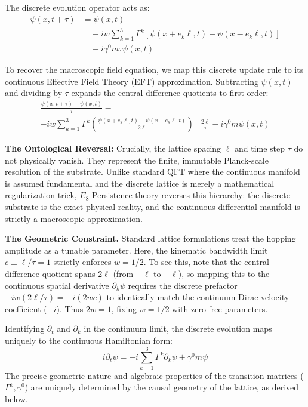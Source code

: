 The discrete evolution operator acts as:
\begin{equation}
\begin{aligned}
    \psi(x,t+\tau) &= \psi(x,t) \\
    &\quad - iw \sum_{k=1}^3 \Gamma^k \left[\psi(x+e_k\ell,t) - \psi(x-e_k\ell,t)\right] \\
    &\quad - i\gamma^0 m\tau\psi(x,t)
\end{aligned}
\label{eq:unitary_flux}
\end{equation}

To recover the macroscopic field equation, we map this discrete update rule to its continuous Effective Field Theory (EFT) approximation. Subtracting $\psi(x,t)$ and dividing by $\tau$ expands the central difference quotients to first order:
\begin{equation}
\begin{aligned}
    \frac{\psi(x,t+\tau) - \psi(x,t)}{\tau} = \\
    -iw \sum_{k=1}^3 \Gamma^k \left( \frac{\psi(x+e_k\ell,t) - \psi(x-e_k\ell,t)}{2\ell} \right) &\frac{2\ell}{\tau} - i\gamma^0 m\psi(x,t)
\end{aligned}
\label{eq:diff_form}
\end{equation}

\textbf{The Ontological Reversal:} Crucially, the lattice spacing $\ell$ and time step $\tau$ do not physically vanish. They represent the finite, immutable Planck-scale resolution of the substrate. Unlike standard QFT where the continuous manifold is assumed fundamental and the discrete lattice is merely a mathematical regularization trick, $E_8$-Persistence theory reverses this hierarchy: the discrete substrate is the exact physical reality, and the continuous differential manifold is strictly a macroscopic approximation.

\textbf{The Geometric Constraint.} Standard lattice formulations treat the hopping amplitude as a tunable parameter. Here, the kinematic bandwidth limit $c \equiv \ell/\tau = 1$ strictly enforces $w = 1/2$. To see this, note that the central difference quotient spans $2\ell$ (from $-\ell$ to $+\ell$), so mapping this to the continuous spatial derivative $\partial_k\psi$ requires the discrete prefactor $-iw(2\ell/\tau) = -i(2wc)$ to identically match the continuum Dirac velocity coefficient ($-i$). Thus $2w = 1$, fixing $w = 1/2$ with zero free parameters.

Identifying $\partial_t$ and $\partial_k$ in the continuum limit, the discrete evolution maps uniquely to the continuous Hamiltonian form:
\begin{equation}
    i \partial_t \psi = -i \sum_{k=1}^{3} \Gamma^k \partial_k \psi + \gamma^0 m \psi
\end{equation}
The precise geometric nature and algebraic properties of the transition matrices ($\Gamma^k, \gamma^0$) are uniquely determined by the causal geometry of the lattice, as derived below.

